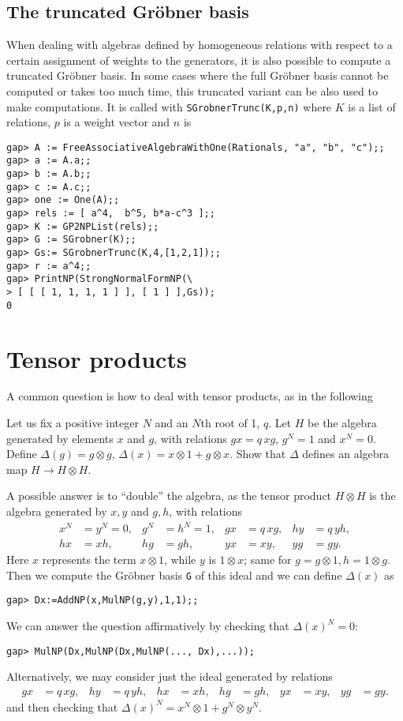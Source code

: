 \subsection{The truncated Gr\"obner basis}
When dealing with algebras defined by homogeneous relations with respect to a certain assignment of weights to the generators, it is also possible to compute a truncated Gr\"obner basis. In some cases where the full Gr\"obner basis cannot be computed or takes too much time, this truncated variant can be also used to make computations. It is called with  \lstinline{SGrobnerTrunc(K,p,n)} where $K$ is a list of relations, $p$ is a weight vector and $n$ is     
\begin{lstlisting}
gap> A := FreeAssociativeAlgebraWithOne(Rationals, "a", "b", "c");;
gap> a := A.a;;
gap> b := A.b;;
gap> c := A.c;;
gap> one := One(A);;
gap> rels := [ a^4,  b^5, b*a-c^3 ];;
gap> K := GP2NPList(rels);;
gap> G := SGrobner(K);;
gap> Gs:= SGrobnerTrunc(K,4,[1,2,1]);;
gap> r := a^4;;
gap> PrintNP(StrongNormalFormNP(\
> [ [ [ 1, 1, 1, 1 ] ], [ 1 ] ],Gs));
0
\end{lstlisting}

\section{Tensor products}

A common question is how to deal with tensor products, as in the following

\begin{question}\label{question-taft} 
	Let us fix a positive integer $N$ and an $N$th root of 1, $q$.  Let $H$ be the algebra
	generated by elements $x$ and $g$, with relations $gx=q\,xg$, $g^N=1$ and
	$x^N=0$. Define $\Delta(g)=g\otimes g$, $\Delta(x)=x\otimes 1+g\otimes x$.
	Show that $\Delta$ defines an algebra map $H\to H\otimes H$.
\end{question}

A possible answer is to ``double'' the algebra, as the tensor product $H\otimes H$ is the algebra generated by $x,y$ and $g,h$, with relations
\begin{align*}
x^N&=y^N=0, & g^N&=h^N=1, & gx&=q\,xg, & hy&=q\,yh, \\
hx&=xh, & hg&=gh, & yx&=xy, & yg&=gy.
\end{align*}
Here $x$ represents the term $x\otimes 1$, while $y$ is $1\otimes x$; same for $g=g\otimes 1,h=1\otimes g$. Then we compute the Gr\"obner basis \lstinline{G} of this ideal and we can define $\Delta(x)$ as
\begin{lstlisting}
gap> Dx:=AddNP(x,MulNP(g,y),1,1);;
\end{lstlisting}
We can answer the question affirmatively by checking that $\Delta(x)^N=0$:
\begin{lstlisting}
gap> MulNP(Dx,MulNP(Dx,MulNP(..., Dx),...));
\end{lstlisting}
Alternatively, we may consider just the ideal generated by relations
\begin{align*}
gx&=q\,xg, & hy&=q\,yh, & hx&=xh, & hg&=gh, & yx&=xy, & yg&=gy.
\end{align*}
and then checking that $\Delta(x)^N=x^N\otimes 1+g^N\otimes y^N$.

